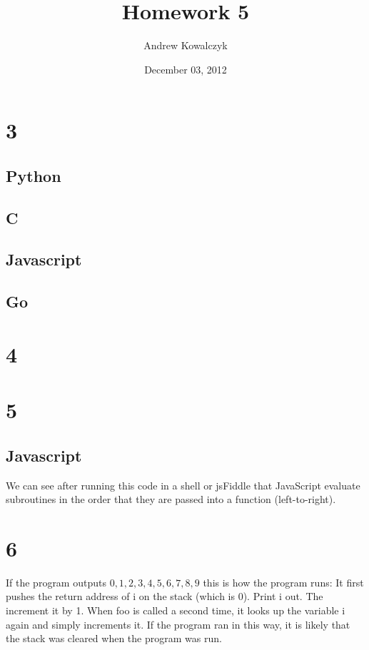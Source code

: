 \documentclass[11pt, oneside]{article}
\title{Homework 5}
\author{Andrew Kowalczyk}
\date{December 03, 2012}							%
\begin{document}
\maketitle

\section*{3}
\subsection*{Python}


\subsection*{C}


\subsection*{Javascript}


\subsection*{Go}


\section*{4}

\section*{5}
\subsection*{Javascript}


We can see after running this code in a shell or jsFiddle that JavaScript evaluate subroutines in the order that they are passed into a function (left-to-right).

\section*{6}
If the program outputs $0, 1, 2, 3, 4, 5, 6, 7, 8, 9$ this is how the program runs: It first pushes the return address of i on the stack (which is 0). Print i out. The increment it by 1. When foo is called a second time, it looks up the variable i again and simply increments it. If the program ran in this way, it is likely that the stack was cleared when the program was run.
\end{document}
